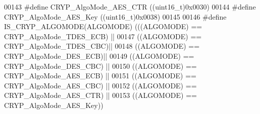 \begin{DoxyCode}
00143 \textcolor{preprocessor}{#}\textcolor{preprocessor}{define} \textcolor{preprocessor}{CRYP\_AlgoMode\_AES\_CTR}     \textcolor{preprocessor}{(}\textcolor{preprocessor}{(}\textcolor{preprocessor}{uint16\_t}\textcolor{preprocessor}{)}0x0030\textcolor{preprocessor}{)}
00144 \textcolor{preprocessor}{#}\textcolor{preprocessor}{define} \textcolor{preprocessor}{CRYP\_AlgoMode\_AES\_Key}     \textcolor{preprocessor}{(}\textcolor{preprocessor}{(}\textcolor{preprocessor}{uint16\_t}\textcolor{preprocessor}{)}0x0038\textcolor{preprocessor}{)}
00145 
00146 \textcolor{preprocessor}{#}\textcolor{preprocessor}{define} \textcolor{preprocessor}{IS\_CRYP\_ALGOMODE}\textcolor{preprocessor}{(}\textcolor{preprocessor}{ALGOMODE}\textcolor{preprocessor}{)} \textcolor{preprocessor}{(}\textcolor{preprocessor}{(}\textcolor{preprocessor}{(}\textcolor{preprocessor}{ALGOMODE}\textcolor{preprocessor}{)} \textcolor{preprocessor}{==} CRYP_AlgoMode_TDES_ECB\textcolor{preprocessor}{)} \textcolor{preprocessor}{||}
00147                                    \textcolor{preprocessor}{(}\textcolor{preprocessor}{(}\textcolor{preprocessor}{ALGOMODE}\textcolor{preprocessor}{)} \textcolor{preprocessor}{==} CRYP_AlgoMode_TDES_CBC\textcolor{preprocessor}{)}\textcolor{preprocessor}{||}
00148                                    \textcolor{preprocessor}{(}\textcolor{preprocessor}{(}\textcolor{preprocessor}{ALGOMODE}\textcolor{preprocessor}{)} \textcolor{preprocessor}{==} CRYP_AlgoMode_DES_ECB\textcolor{preprocessor}{)}\textcolor{preprocessor}{||}
00149                                    \textcolor{preprocessor}{(}\textcolor{preprocessor}{(}\textcolor{preprocessor}{ALGOMODE}\textcolor{preprocessor}{)} \textcolor{preprocessor}{==} CRYP_AlgoMode_DES_CBC\textcolor{preprocessor}{)} \textcolor{preprocessor}{||}
00150                                    \textcolor{preprocessor}{(}\textcolor{preprocessor}{(}\textcolor{preprocessor}{ALGOMODE}\textcolor{preprocessor}{)} \textcolor{preprocessor}{==} CRYP_AlgoMode_AES_ECB\textcolor{preprocessor}{)} \textcolor{preprocessor}{||}
00151                                    \textcolor{preprocessor}{(}\textcolor{preprocessor}{(}\textcolor{preprocessor}{ALGOMODE}\textcolor{preprocessor}{)} \textcolor{preprocessor}{==} CRYP_AlgoMode_AES_CBC\textcolor{preprocessor}{)} \textcolor{preprocessor}{||}
00152                                    \textcolor{preprocessor}{(}\textcolor{preprocessor}{(}\textcolor{preprocessor}{ALGOMODE}\textcolor{preprocessor}{)} \textcolor{preprocessor}{==} CRYP_AlgoMode_AES_CTR\textcolor{preprocessor}{)} \textcolor{preprocessor}{||}
00153                                    \textcolor{preprocessor}{(}\textcolor{preprocessor}{(}\textcolor{preprocessor}{ALGOMODE}\textcolor{preprocessor}{)} \textcolor{preprocessor}{==} CRYP_AlgoMode_AES_Key\textcolor{preprocessor}{)}\textcolor{preprocessor}{)}

\end{DoxyCode}

